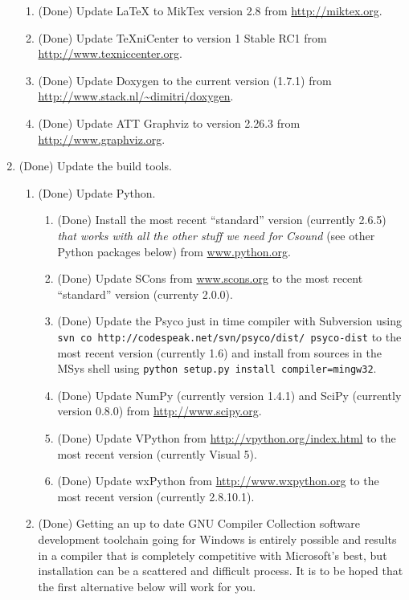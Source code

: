 \documentclass[11pt,letterpaper,onecolumn]{scrartcl}
\begin{document}
\begin{sloppypar}
\begin{enumerate}
\begin{enumerate}
	    \item (Done) Update LaTeX to MikTex version 2.8 from \url{http://miktex.org}.
	    \item (Done) Update TeXniCenter to version 1 Stable RC1 from \url{http://www.texniccenter.org}. 
	    \item (Done) Update Doxygen to the current version (1.7.1) from \url{http://www.stack.nl/~dimitri/doxygen}.
	    \item (Done) Update ATT Graphviz to version 2.26.3 from \url{http://www.graphviz.org}.
		\end{enumerate}
	\item (Done) Update the build tools.   
		\begin{enumerate}
  		\item (Done) Update Python.
				\begin{enumerate}
					\item (Done) Install the most recent ``standard'' version (currently 2.6.5) \emph{that works with all the other stuff we need for Csound} (see other Python packages below) from \url{www.python.org}.
	    		\item (Done) Update SCons from \url{www.scons.org} to the most recent ``standard'' version (currenty 2.0.0).
	    	  \item (Done) Update the Psyco just in time compiler with Subversion using \verb|svn co http://codespeak.net/svn/psyco/dist/ psyco-dist|  to the most recent version (currently 1.6) and install from sources in the MSys shell using \verb|python setup.py install compiler=mingw32|.
	    		\item (Done) Update NumPy (currently version 1.4.1) and SciPy (currently version 0.8.0) from \url{http://www.scipy.org}.
	    		\item (Done) Update VPython from \url{http://vpython.org/index.html} to the most recent version (currently Visual 5).
	    		\item (Done) Update wxPython from \url{http://www.wxpython.org} to the most recent version (currently 2.8.10.1).
				\end{enumerate}
			\item (Done) Getting an up to date GNU Compiler Collection software development toolchain going for Windows is entirely possible and results in a compiler that is completely competitive with Microsoft's best, but installation can be a scattered and difficult process. It is to be hoped that the first alternative below will work for you. 
				\begin{enumerate}

\end{enumerate}
\end{enumerate}
\end{enumerate}
\end{sloppypar}
\end{document}
